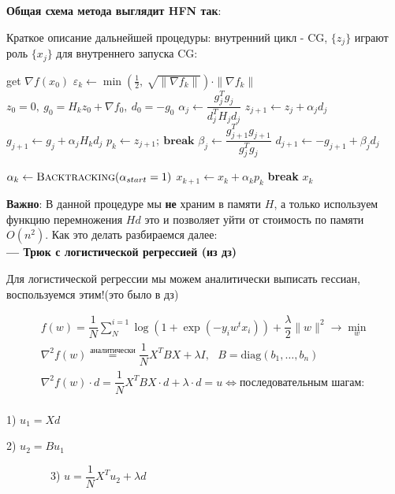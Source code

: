 \textbf{Общая схема метода выглядит HFN так}:

Краткое описание дальнейшей процедуры: внутренний цикл - CG, $\{z_j\}$ играют роль $\{x_j\}$ для внутреннего запуска CG:

\begin{algorithm}[H]
    \begin{algorithmic}[1]
            \State get $\nabla f(x_0)$
                \State $\varepsilon_k \gets \min\left(\frac{1}{2},\ \sqrt{\|\nabla f_k\|}\right)\cdot\|\nabla f_k\|$
                \State $z_0=0,\ g_0=H_k z_0 + \nabla f_0,\ d_0=-g_0$
                    \State $\alpha_j \gets \dfrac{g_j^ Tg_j}{d_j^T H_j d_j}$
                    \State $z_{j+1} \gets z_j + \alpha_j d_j$
                    \State $g_{j+1} \gets g_{j} + \alpha_j H_k d_j$
                        $p_k \gets z_{j+1};\ \textbf{break}$
                    \EndIf
                    \State $\beta_j \gets \dfrac{g_{j+1}^T g_{j+1}}{g_j^T g_j}$
                    \State $d_{j+1} \gets -g_{j+1} + \beta_jd_j$
                \EndFor

                \State $\alpha_k \gets \textsc{Backtracking}(\alpha_{start} = 1)$
                \State $x_{k+1} \gets x_k + \alpha_k p_k$
                    \textbf{break}
                \EndIf
            \EndFor
            \State \Return $x_k$
        \EndProcedure
    \end{algorithmic}\label{alg:algorithm}
\end{algorithm}

\noindent \textbf{Важно}: В данной процедуре мы \textbf{не} храним в памяти $H$, а только используем функцию перемножения $Hd$ это и позволяет уйти от стоимость по памяти $O(n^2)$. Как это делать разбираемся далее:
\\

\noindent \textbf{--- Трюк с логистической регрессией (из дз)}

Для логистической регрессии мы можем аналитически выписать гессиан, воспользуемся этим!(это было в дз)

\begin{gather*}
    f(w) = \dfrac{1}{N} \sum_{N}^{i=1} \log{(1 + \exp(-y_i w^t x_i)) + \dfrac{\lambda}{2}\|w\|^2} \longrightarrow \underset{w}{\min}\\
    \nabla^2 f(w) \overset{\text{аналитически}}{=} \dfrac{1}{N}X^TBX + \lambda I,\ \ \  B=\text{diag}(b_1, \dots, b_n)\\
    \nabla^2 f(w)\cdot d = \dfrac{1}{N}X^TBX\cdot d + \lambda \cdot d = u \Leftrightarrow \text{последовательным шагам:}\\
\end{gather*}
\begin{center}
    1) $u_1 = Xd \qquad\qquad\qquad\qquad\qquad$

    2) $u_2 = Bu_1 \qquad\qquad\qquad\qquad\ \ \ \ \ $

    \ \ \ \ \ \ \ \  3) $u = \dfrac{1}{N}X^Tu_2 + \lambda d \qquad\qquad\qquad\qquad\ \ $
\end{center}

